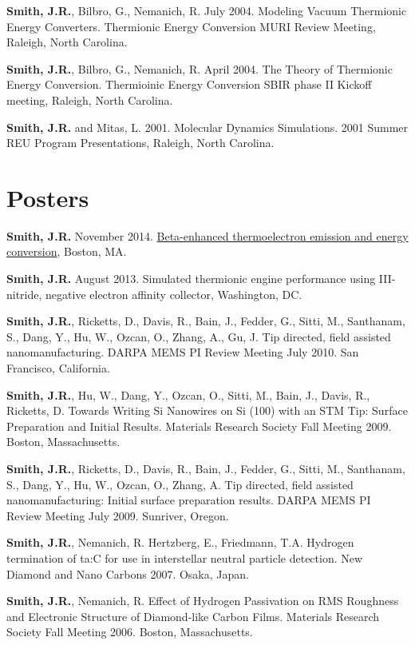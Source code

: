 \textbf{Smith, J.R.}, Bilbro, G., Nemanich, R. July 2004. Modeling
Vacuum Thermionic Energy Converters. Thermionic Energy Conversion MURI
Review Meeting, Raleigh, North Carolina.

\textbf{Smith, J.R.}, Bilbro, G., Nemanich, R. April 2004. The Theory of
Thermionic Energy Conversion. Thermioinic Energy Conversion SBIR phase
II Kickoff meeting, Raleigh, North Carolina.

\textbf{Smith, J.R.} and Mitas, L. 2001. Molecular Dynamics Simulations.
2001 Summer REU Program Presentations, Raleigh, North Carolina.

\section{Posters}

\textbf{Smith, J.R.} November 2014.
\href{https://github.com/jrsmith3/conf-mrs_fall_2014_poster/releases}{Beta-enhanced
thermoelectron emission and energy conversion}, Boston, MA.

\textbf{Smith, J.R.} August 2013. Simulated thermionic engine
performance using III-nitride, negative electron affinity collector,
Washington, DC.

\textbf{Smith, J.R.}, Ricketts, D., Davis, R., Bain, J., Fedder, G.,
Sitti, M., Santhanam, S., Dang, Y., Hu, W., Ozcan, O., Zhang, A., Gu, J.
Tip directed, field assisted nanomanufacturing. DARPA MEMS PI Review
Meeting July 2010. San Francisco, California.

\textbf{Smith, J.R.}, Hu, W., Dang, Y., Ozcan, O., Sitti, M., Bain, J.,
Davis, R., Ricketts, D. Towards Writing Si Nanowires on Si (100) with an
STM Tip: Surface Preparation and Initial Results. Materials Research
Society Fall Meeting 2009. Boston, Massachusetts.

\textbf{Smith, J.R.}, Ricketts, D., Davis, R., Bain, J., Fedder, G.,
Sitti, M., Santhanam, S., Dang, Y., Hu, W., Ozcan, O., Zhang, A. Tip
directed, field assisted nanomanufacturing: Initial surface preparation
results. DARPA MEMS PI Review Meeting July 2009. Sunriver, Oregon.

\textbf{Smith, J.R.}, Nemanich, R. Hertzberg, E., Friedmann, T.A.
Hydrogen termination of ta:C for use in interstellar neutral particle
detection. New Diamond and Nano Carbons 2007. Osaka, Japan.

\textbf{Smith, J.R.}, Nemanich, R. Effect of Hydrogen Passivation on RMS
Roughness and Electronic Structure of Diamond-like Carbon Films.
Materials Research Society Fall Meeting 2006. Boston, Massachusetts.

